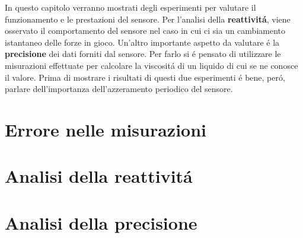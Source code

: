 In questo capitolo verranno mostrati degli esperimenti per valutare il funzionamento e le prestazioni del sensore. 
Per l'analisi della \textbf{reattivit\'{a}}, viene osservato il comportamento del sensore nel caso in cui ci sia 
un cambiamento istantaneo delle forze in gioco. 
Un'altro importante aspetto da valutare \'{e} la \textbf{precisione} dei dati forniti dal sensore. Per farlo 
si \'{e} pensato di utilizzare le misurazioni effettuate per calcolare la viscosit\'{a} di un liquido di cui se ne conosce 
il valore. 
Prima di mostrare i risultati di questi due esperimenti \'{e} bene, per\'{o}, parlare dell'importanza dell'azzeramento periodico 
del sensore.

\section{Errore nelle misurazioni} \label{sec:drifting}


\section{Analisi della reattivit\'{a}}


\section{Analisi della precisione}

